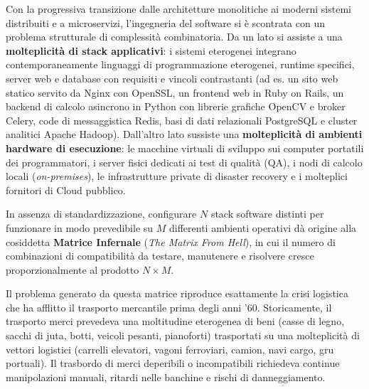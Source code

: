 \documentclass[11pt, a4paper]{article}
\begin{document}
Con la progressiva transizione dalle architetture monolitiche ai moderni sistemi distribuiti e a microservizi, l'ingegneria del software si è scontrata con un problema strutturale di complessità combinatoria. Da un lato si assiste a una \textbf{molteplicità di stack applicativi}: i sistemi eterogenei integrano contemporaneamente linguaggi di programmazione eterogenei, runtime specifici, server web e database con requisiti e vincoli contrastanti (ad es. un sito web statico servito da Nginx con OpenSSL, un frontend web in Ruby on Rails, un backend di calcolo asincrono in Python con librerie grafiche OpenCV e broker Celery, code di messaggistica Redis, basi di dati relazionali PostgreSQL e cluster analitici Apache Hadoop). Dall'altro lato sussiste una \textbf{molteplicità di ambienti hardware di esecuzione}: le macchine virtuali di sviluppo sui computer portatili dei programmatori, i server fisici dedicati ai test di qualità (QA), i nodi di calcolo locali (\emph{on-premises}), le infrastrutture private di disaster recovery e i molteplici fornitori di Cloud pubblico.


In assenza di standardizzazione, configurare $N$ stack software distinti per funzionare in modo prevedibile su $M$ differenti ambienti operativi dà origine alla cosiddetta \textbf{Matrice Infernale} (\emph{The Matrix From Hell}), in cui il numero di combinazioni di compatibilità da testare, manutenere e risolvere cresce proporzionalmente al prodotto $N \times M$.


Il problema generato da questa matrice riproduce esattamente la crisi logistica che ha afflitto il trasporto mercantile prima degli anni '60. Storicamente, il trasporto merci prevedeva una moltitudine eterogenea di beni (casse di legno, sacchi di juta, botti, veicoli pesanti, pianoforti) trasportati su una molteplicità di vettori logistici (carrelli elevatori, vagoni ferroviari, camion, navi cargo, gru portuali). Il trasbordo di merci deperibili o incompatibili richiedeva continue manipolazioni manuali, ritardi nelle banchine e rischi di danneggiamento.
\end{document}
